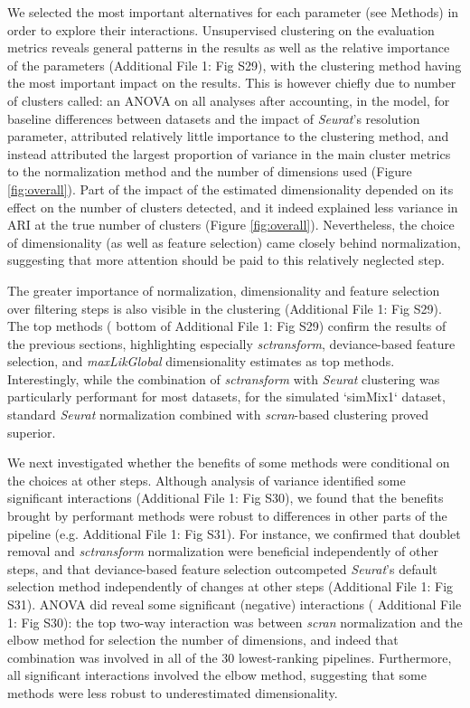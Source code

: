 \documentclass{bmcart}
\begin{document}
We selected the most important alternatives for each parameter (see Methods) in order to explore their interactions. Unsupervised clustering on the evaluation metrics reveals general patterns in the results as well as the relative importance of the parameters (Additional File 1: Fig S29), with the clustering method having the most important impact on the results. This is however chiefly due to number of clusters called: an ANOVA on all analyses after accounting, in the model, for baseline differences between datasets and the impact of \textit{Seurat}'s resolution parameter, attributed relatively little importance to the clustering method, and instead attributed the largest proportion of variance in the main cluster metrics to the {\color{red} normalization method and the number of dimensions used (Figure \ref{fig:overall}). Part of the impact of the estimated dimensionality depended on its effect on the number of clusters detected, and it indeed explained less variance in ARI at the true number of clusters (Figure \ref{fig:overall}). Nevertheless, the choice of dimensionality (as well as feature selection) came closely behind normalization, suggesting that more attention should be paid to this relatively neglected step.}

The greater importance of normalization, dimensionality and feature selection over filtering steps is also visible in the clustering ({\color{red}Additional File 1: Fig S29}). The top methods ({\color{red} bottom of Additional File 1: Fig S29}) confirm the results of the previous sections, highlighting especially \textit{sctransform}, deviance-based feature selection, and \textit{maxLikGlobal} dimensionality estimates as top methods. Interestingly, while the combination of \textit{sctransform} with \textit{Seurat} clustering was particularly performant for most datasets, for the simulated `simMix1` dataset,  standard \textit{Seurat} normalization combined with \textit{scran}-based clustering proved superior.

{\color{red}We next investigated whether the benefits of some methods were conditional on the choices at other steps. Although analysis of variance identified some significant interactions (Additional File 1: Fig S30), we found that the benefits brought by performant methods were robust to differences in other parts of the pipeline (e.g. Additional File 1: Fig S31).} For instance, we confirmed that doublet removal and \textit{sctransform} normalization were beneficial independently of other steps, and that deviance-based feature selection outcompeted \textit{Seurat}'s default selection method independently of changes at other steps (Additional File 1: Fig S31). ANOVA did reveal some significant (negative) interactions ({\color{red} Additional File 1: Fig S30}): the top two-way interaction was between \textit{scran} normalization and the elbow method for selection the number of dimensions, and indeed that combination was involved in all of the 30 lowest-ranking pipelines. Furthermore, all significant interactions involved the elbow method, suggesting that some methods were less robust to underestimated dimensionality.
\end{document}
